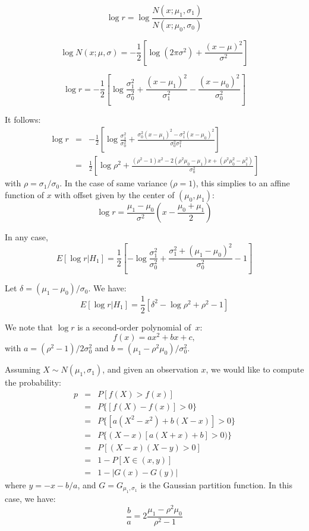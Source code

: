 \documentclass[english]{scrartcl}
\begin{document}
$$
\log r = \log \frac{N(x;\mu_1,\sigma_1)}{N(x;\mu_0,\sigma_0)}
$$

$$
\log N(x;\mu,\sigma) = -\frac{1}{2}\left[
\log(2\pi\sigma^2) + \frac{(x-\mu)^2}{\sigma^2}
\right]
$$

$$
\log r = -\frac{1}{2}
\left[
\log \frac{\sigma_1^2}{\sigma_0^2}
+ \frac{(x-\mu_1)^2}{\sigma_1^2} - \frac{(x-\mu_0)^2}{\sigma_0^2}
\right]
$$

It follows:
\begin{eqnarray*}
\log r 
 & = & 
-\frac{1}{2}\left[
\log \frac{\sigma_1^2}{\sigma_0^2}
+ \frac{\sigma_0^2(x-\mu_1)^2 - \sigma_1^2(x-\mu_0)^2}{\sigma_0^2 \sigma_1^2}
\right] \\
 & = & 
\frac{1}{2}\left[
\log \rho^2
+ \frac{(\rho^2-1)x^2 - 2(\rho^2\mu_0-\mu_1)x+ (\rho^2\mu_0 ^2-\mu_1^2)}{\sigma_0^2}
\right]
\end{eqnarray*}
with $\rho=\sigma_1/\sigma_0$. In the case of same variance ($\rho=1$), this simplies to an affine function of $x$ with offset given by the center of $(\mu_0,\mu_1)$:
$$
\log r = \frac{\mu_1-\mu_0}{\sigma^2} \left(
x - \frac{\mu_0 + \mu_1}{2}
\right) 
$$

In any case,
$$
E[\log r | H_1] = 
\frac{1}{2}
\left[
- \log \frac{\sigma_1^2}{\sigma_0^2}
+ \frac{\sigma_1^2 + (\mu_1-\mu_0)^2}{\sigma_0^2}
- 1
\right]
$$

Let $\delta = (\mu_1-\mu_0)/\sigma_0$. We have:
$$
E[\log r | H_1] = 
\frac{1}{2}
\left[
\delta^2
- \log \rho^2
+ \rho^2  - 1
\right]
$$

We note that $\log r$ is a second-order polynomial of~$x$:
$$
f(x) = a x^2 + b x + c,
$$
with $a=(\rho^2-1)/2\sigma_0^2$ and $b=(\mu_1-\rho^2\mu_0)/\sigma_0^2$.

Assuming $X\sim N(\mu_1,\sigma_1)$, and given an observation $x$, we would like to compute the probability:
\begin{eqnarray*}
p 
& = & P[f(X)>f(x)] \\
& = & P\{[f(X)-f(x)]>0\}\\
& = & P\{[a(X^2-x^2)+b(X-x)]>0\}\\
& = & P\{(X-x)[a(X+x)+b]>0)\}\\
& = & P[(X-x)(X-y)>0]\\
& = & 1 - P[X\in(x,y)]\\
& = & 1 - |G(x)-G(y)|
\end{eqnarray*}
where $y=-x-b/a$, and $G=G_{\mu_1,\sigma_1}$ is the Gaussian partition function. In this case, we have:
$$
\frac{b}{a} = 2 \frac{\mu_1-\rho^2\mu_0}{\rho^2-1}
$$
\end{document}
